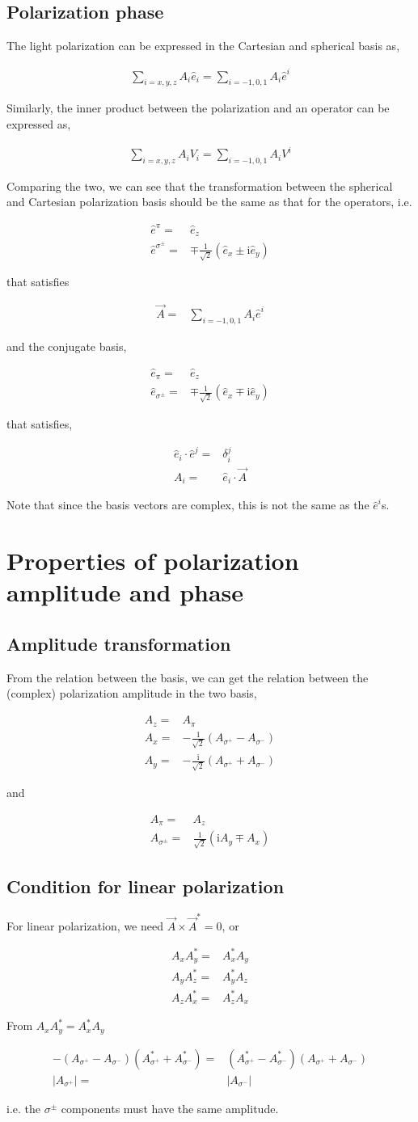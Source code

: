 \documentclass[10pt,fleqn]{article}
\newcommand{\ui}{\mathrm{i}}
\newcommand{\eqar}[1]
{
  \begin{align}
    #1
  \end{align}
}
\newcommand{\paren}[1]{{\left({#1}\right)}}
\newcommand{\abs}[1]{{\left|{#1}\right|}}
\begin{document}
\subsection{Polarization phase}
The light polarization can be expressed in the Cartesian and spherical basis as,
\eqar{
  \sum_{i=x,y,z}\!A_i\hat e_i=\sum_{i=-1,0,1}\!A_i\hat e^i
}
Similarly, the inner product between the polarization and an operator
can be expressed as,
\eqar{
  \sum_{i=x,y,z}\!A_i V_i=\sum_{i=-1,0,1}\!A_i V^i
}
Comparing the two, we can see that the transformation between the spherical
and Cartesian polarization basis should be the same as that for the operators, i.e.
{
  \color{red}
  \eqar{
    \hat e^\pi=&\hat e_z\\
    \hat e^{\sigma^\pm}=&\mp\frac{1}{\sqrt{2}}\paren{\hat e_x\pm\ui\hat e_y}
  }
  that satisfies
  \eqar{
    \vec A=&\sum_{i=-1,0,1}\!A_i\hat e^i
  }
}
and the conjugate basis,
{
  \color{blue}
  \eqar{
    \hat e_\pi=&\hat e_z\\
    \hat e_{\sigma^\pm}=&\mp\frac{1}{\sqrt{2}}\paren{\hat e_x\mp\ui\hat e_y}
  }
  that satisfies,
  \eqar{
    \hat e_i\cdot\hat e^j=&\delta_i^j\\
    A_i=&\hat e_i\cdot\vec A
  }
}
Note that since the basis vectors are complex, this is not the same as the $\hat e^i$s.
\section{Properties of polarization amplitude and phase}
\subsection{Amplitude transformation}
From the relation between the basis, we can get the relation between
the (complex) polarization amplitude in the two basis,
{
  \color{red}
  \eqar{
    A_z=&A_\pi\\
    A_x=&-\frac{1}{\sqrt{2}}\paren{A_{\sigma^+}-A_{\sigma^-}}\\
    A_y=&-\frac{\ui}{\sqrt{2}}\paren{A_{\sigma^+}+A_{\sigma^-}}
  }
}
and
{
  \color{red}
  \eqar{
    A_\pi=&A_z\\
    A_{\sigma^\pm}=&\frac{1}{\sqrt{2}}\paren{\ui A_y\mp A_x}
  }
}
\subsection{Condition for linear polarization}
For linear polarization, we need $\vec A\times\vec A^*=0$, or
\eqar{
  A_xA_y^*=&A_x^*A_y\\
  A_yA_z^*=&A_y^*A_z\\
  A_zA_x^*=&A_z^*A_x
}
From $A_xA_y^*=A_x^*A_y$
\eqar{
  -\paren{A_{\sigma^+}-A_{\sigma^-}}\paren{A_{\sigma^+}^*+A_{\sigma^-}^*}=&\paren{A_{\sigma^+}^*-A_{\sigma^-}^*}\paren{A_{\sigma^+}+A_{\sigma^-}}\\
  \abs{A_{\sigma^+}}=&\abs{A_{\sigma^-}}
}
i.e. the $\sigma^\pm$ components must have the same amplitude.\\
\end{document}
